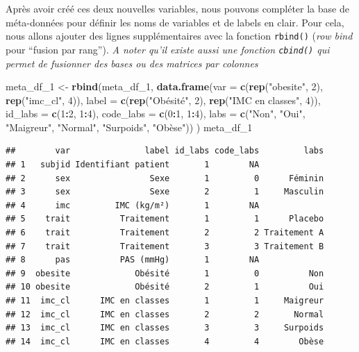 \documentclass[
]{book}
\newenvironment{Shaded}{\begin{snugshade}}{\end{snugshade}}
\newcommand{\AttributeTok}[1]{\textcolor[rgb]{0.13,0.29,0.53}{#1}}
\newcommand{\DecValTok}[1]{\textcolor[rgb]{0.00,0.00,0.81}{#1}}
\newcommand{\FunctionTok}[1]{\textcolor[rgb]{0.13,0.29,0.53}{\textbf{#1}}}
\newcommand{\NormalTok}[1]{#1}
\newcommand{\OtherTok}[1]{\textcolor[rgb]{0.56,0.35,0.01}{#1}}
\newcommand{\SpecialCharTok}[1]{\textcolor[rgb]{0.81,0.36,0.00}{\textbf{#1}}}
\newcommand{\StringTok}[1]{\textcolor[rgb]{0.31,0.60,0.02}{#1}}
\begin{document}
Après avoir créé ces deux nouvelles variables, nous pouvons compléter la base de méta-données pour définir les noms de variables et de labels en clair. Pour cela, nous allons ajouter des lignes supplémentaires avec la fonction \texttt{rbind()} (\emph{row bind} pour ``fusion par rang''). \emph{A noter qu'il existe aussi une fonction \texttt{cbind()} qui permet de fusionner des bases ou des matrices par colonnes}

\begin{Shaded}
\begin{Highlighting}[]
\NormalTok{meta\_df\_1 }\OtherTok{\textless{}{-}} \FunctionTok{rbind}\NormalTok{(meta\_df\_1, }
                   \FunctionTok{data.frame}\NormalTok{(}\AttributeTok{var =} \FunctionTok{c}\NormalTok{(}\FunctionTok{rep}\NormalTok{(}\StringTok{"obesite"}\NormalTok{, }\DecValTok{2}\NormalTok{), }
                                      \FunctionTok{rep}\NormalTok{(}\StringTok{"imc\_cl"}\NormalTok{, }\DecValTok{4}\NormalTok{)),}
                              \AttributeTok{label =} \FunctionTok{c}\NormalTok{(}\FunctionTok{rep}\NormalTok{(}\StringTok{"Obésité"}\NormalTok{, }\DecValTok{2}\NormalTok{), }
                                        \FunctionTok{rep}\NormalTok{(}\StringTok{"IMC en classes"}\NormalTok{, }\DecValTok{4}\NormalTok{)),}
                              \AttributeTok{id\_labs =} \FunctionTok{c}\NormalTok{(}\DecValTok{1}\SpecialCharTok{:}\DecValTok{2}\NormalTok{, }\DecValTok{1}\SpecialCharTok{:}\DecValTok{4}\NormalTok{),}
                              \AttributeTok{code\_labs =} \FunctionTok{c}\NormalTok{(}\DecValTok{0}\SpecialCharTok{:}\DecValTok{1}\NormalTok{, }\DecValTok{1}\SpecialCharTok{:}\DecValTok{4}\NormalTok{),}
                              \AttributeTok{labs =} \FunctionTok{c}\NormalTok{(}\StringTok{"Non"}\NormalTok{, }\StringTok{"Oui"}\NormalTok{,}
                                       \StringTok{"Maigreur"}\NormalTok{, }\StringTok{"Normal"}\NormalTok{, }\StringTok{"Surpoids"}\NormalTok{, }\StringTok{"Obèse"}\NormalTok{))}
\NormalTok{                   )}
\NormalTok{meta\_df\_1}
\end{Highlighting}
\end{Shaded}

\begin{verbatim}
##        var               label id_labs code_labs         labs
## 1   subjid Identifiant patient       1        NA             
## 2      sex                Sexe       1         0      Féminin
## 3      sex                Sexe       2         1     Masculin
## 4      imc         IMC (kg/m²)       1        NA             
## 5    trait          Traitement       1         1      Placebo
## 6    trait          Traitement       2         2 Traitement A
## 7    trait          Traitement       3         3 Traitement B
## 8      pas          PAS (mmHg)       1        NA             
## 9  obesite             Obésité       1         0          Non
## 10 obesite             Obésité       2         1          Oui
## 11  imc_cl      IMC en classes       1         1     Maigreur
## 12  imc_cl      IMC en classes       2         2       Normal
## 13  imc_cl      IMC en classes       3         3     Surpoids
## 14  imc_cl      IMC en classes       4         4        Obèse
\end{verbatim}
\end{document}
